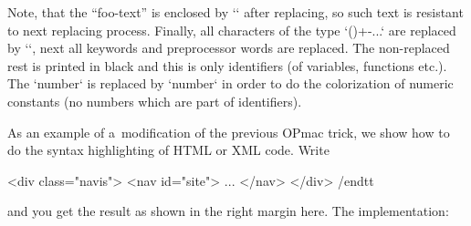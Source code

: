 Note, that the “foo-text” is enclosed by `{}` after replacing, so such text is resistant to next replacing process. Finally, all characters of the type `(){}+-...` are replaced by `\n`, next all keywords and preprocessor words are replaced. The non-replaced rest is printed in black and this is only identifiers (of variables, functions etc.). The `\n number` is replaced by `\numC number` in order to do the colorization of numeric constants (no numbers which are part of identifiers). 


 





As an example of a~modification of the previous OPmac trick, we show how to do the syntax highlighting of HTML or XML code. Write 

\begtt
{} 
\begtt 
<div class="navis"> 
<nav id="site"> 
... 
</nav> 
</div> 
/endtt 
\endtt


and you get the result as shown in the right margin here. The implementation: 

\begtt
\def\hisyntax#1{\bgroup\def\ptthook{\csname hisyntax#1\endcsname}} 
\def\ghisyntax#1{\def\ptthook{\bgroup\csname hisyntax#1\endcsname}} 
 
